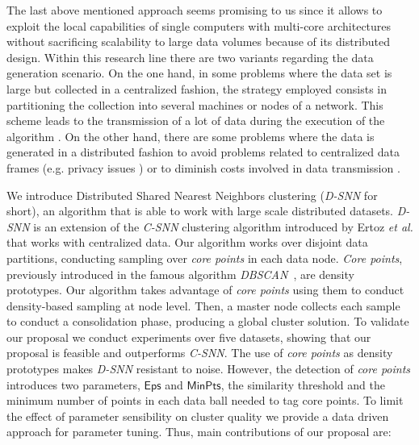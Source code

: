 \documentclass[preprint,12pt,authoryear,review]{elsarticle}
\begin{document}
The last above mentioned approach seems promising to us since it allows to exploit the local capabilities of single computers with multi-core architectures without sacrificing scalability to large data volumes because of its distributed design. Within this research line there are two variants regarding the data generation scenario. On the one hand, in some problems where the data set is large but collected in a centralized fashion, the strategy employed consists in partitioning the collection into several machines or nodes of a network. This scheme leads to the transmission of a lot of data during the execution of the algorithm \cite{N15}. On the other hand, there are some problems where the data is generated in a distributed fashion to avoid problems related to centralized data frames (e.g. privacy issues \cite{JW05}) or to diminish costs involved in data transmission \cite{LHLX12}. %

We introduce Distributed Shared Nearest Neighbors clustering (\textit{D-SNN} for short), an algorithm that is able to work with large scale distributed datasets.  
\textit{D-SNN} is an extension of the \textit{C-SNN} clustering algorithm introduced by Ertoz \textit{et al.} \cite{ESK03} that works with centralized data. 
Our algorithm works over disjoint data partitions, conducting sampling over \textit{core points} in each data node. \textit{Core points}, previously introduced in the famous algorithm \textit{DBSCAN}~\cite{E96}, are density prototypes. Our algorithm takes advantage of \textit{core points} using them to conduct density-based sampling at node level. Then, a master node collects each sample to conduct a consolidation phase, producing a global cluster solution. To validate our proposal we conduct experiments over five datasets, showing that our proposal is feasible and outperforms \textit{C-SNN}. The use of \textit{core points} as density prototypes makes \textit{D-SNN} resistant to noise. However, the detection of \textit{core points} introduces two parameters, $\mathsf{Eps}$ and $\mathsf{MinPts}$, the similarity threshold and the minimum number of points in each data ball needed to tag core points. To limit the effect of parameter sensibility on cluster quality we provide a data driven approach for parameter tuning. Thus, main contributions of our proposal are:
\end{document}
